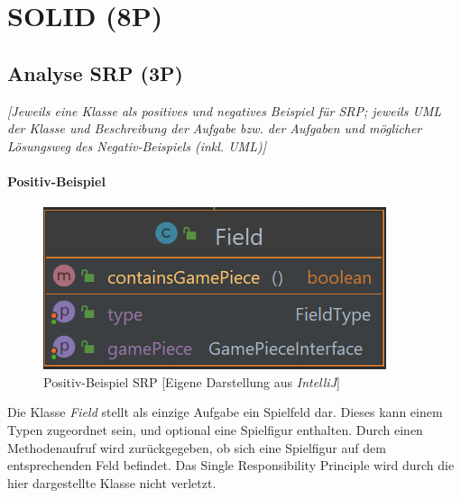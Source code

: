 
\titlespacing*{\chapter}{0pt}{-30mm}{10pt}
  
\chapter{SOLID (8P)}
\pagestyle{scrheadings}
\clearscrheadfoot
{}
\setcounter{page}{3}
\ofoot[\pagemark]{\pagemark}
\onehalfspacing

\section{Analyse SRP (3P)}
\emph{[Jeweils eine Klasse als positives und negatives Beispiel für SRP; jeweils UML der Klasse und
Beschreibung der Aufgabe bzw. der Aufgaben und möglicher Lösungsweg des Negativ-Beispiels (inkl.
UML)]}

\subsubsection{Positiv-Beispiel}
\begin{figure}[htbp]
\centering
\centerline{\includegraphics[scale=.6]{positivbeispiel_srp}}
\caption{Positiv-Beispiel SRP [Eigene Darstellung aus \emph{IntelliJ}]}
\label{fig:positivbeispiel_srp}
\end{figure}
\noindent Die Klasse \emph{Field} stellt als einzige Aufgabe ein Spielfeld dar. Dieses kann einem Typen zugeordnet sein, und optional eine Spielfigur enthalten. Durch einen Methodenaufruf wird zurückgegeben, ob sich eine Spielfigur auf dem entsprechenden Feld befindet. Das Single Responsibility Principle wird durch die hier dargestellte Klasse nicht verletzt.


